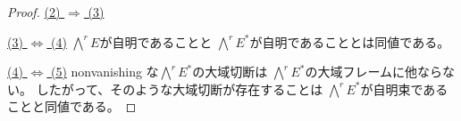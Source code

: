 \documentclass[report]{jlreq}
\begin{document}
\begin{proof}

    \uline{(2) $\Rightarrow$ (3)} \quad

    \uline{(3) $\Leftrightarrow$ (4)} \quad
    $\bigwedge^r E$が自明であることと
    $\bigwedge^r E^*$が自明であることとは同値である。

    \uline{(4) $\Leftrightarrow$ (5)} \quad
    nonvanishing な$\bigwedge^r E^*$の大域切断は
    $\bigwedge^r E^*$の大域フレームに他ならない。
    したがって、そのような大域切断が存在することは
    $\bigwedge^r E^*$が自明束であることと同値である。
    
    \TODO{}
\end{proof}
\end{document}
